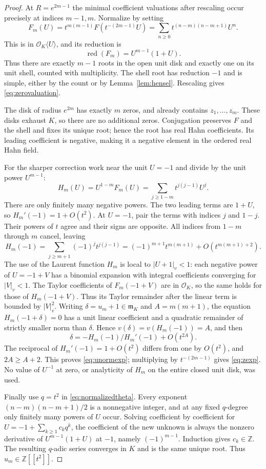\documentclass[11pt,a4paper]{article}
\numberwithin{equation}{section}
\theoremstyle{definition}
\theoremstyle{remark}
\newcommand{\Z}{\mathbb Z}
\newcommand{\OO}{\mathcal O}
\newcommand{\mm}{\mathfrak m}
\newcommand{\vabs}[1]{\lvert#1\rvert_v}
\newcommand{\red}{\operatorname{red}}
\begin{document}
\begin{proof}
At $R=e^{2m-1}$ the minimal coefficient valuations after rescaling occur
precisely at indices $m-1,m$. Normalize by setting
\begin{equation}\label{eq:normalizedtheta}
 F_m(U)=t^{m(m-1)}F\left(t^{-(2m-1)}U\right)
       =\sum_{n\ge0}t^{(n-m)(n-m+1)}U^n.
\end{equation}
This is in $\OO_K\langle U\rangle$, and its reduction is
\[
 \red(F_m)=U^{m-1}(1+U).
\]
Thus there are exactly $m-1$ roots in the open unit disk and exactly one on its
unit shell, counted with multiplicity. The shell root has reduction $-1$ and
is simple, either by the count or by Lemma~\ref{lem:hensel}.
Rescaling gives \eqref{eq:zerovaluation}.

The disk of radius $e^{2m}$ has exactly $m$ zeros, and already contains
$z_1,\ldots,z_m$. These disks exhaust $K$, so there are no additional zeros.
Conjugation preserves $F$ and the shell and fixes its unique root; hence the
root has real Hahn coefficients. Its leading coefficient is negative, making
it a negative element in the ordered real Hahn field.

For the sharper correction work near the unit $U=-1$ and divide by the unit
power $U^{m-1}$:
\begin{equation}\label{eq:Hm}
 H_m(U)=U^{1-m}F_m(U)
       =\sum_{j\ge1-m}t^{j(j-1)}U^j.
\end{equation}
There are only finitely many negative powers. The two leading terms are
$1+U$, so $H_m'(-1)=1+O(t^2)$. At $U=-1$, pair the terms with indices
$j$ and $1-j$. Their powers of $t$ agree and their signs are opposite.
All indices from $1-m$ through $m$ cancel, leaving
\[
 H_m(-1)=\sum_{j\ge m+1}(-1)^j t^{j(j-1)}
        =(-1)^{m+1}t^{m(m+1)}
          +O\!\left(t^{m(m+1)+2}\right).
\]
The use of the Laurent function $H_m$ is local to $\vabs{U+1}<1$:
each negative power of $U=-1+V$ has a binomial expansion with integral
coefficients converging for $\vabs V<1$. The Taylor coefficients of
$F_m(-1+V)$ are in $\OO_K$, so the same holds for those of $H_m(-1+V)$.
Thus its Taylor remainder after the linear term is bounded by $\vabs V^2$.
Writing $\delta=u_m+1\in\mm_K$ and $A=m(m+1)$, the equation
$H_m(-1+\delta)=0$ has a unit linear coefficient and a quadratic remainder
of strictly smaller norm than $\delta$. Hence
$v(\delta)=v(H_m(-1))=A$, and then
\[
 \delta=-H_m(-1)/H_m'(-1)+O(t^{2A}).
\]
The reciprocal of $H_m'(-1)=1+O(t^2)$ differs from one by $O(t^2)$,
and $2A\ge A+2$. This proves \eqref{eq:unormexp}; multiplying by
$t^{-(2m-1)}$ gives \eqref{eq:zexp}. No value of $U^{-1}$ at zero,
or analyticity of $H_m$ on the entire closed unit disk, was used.

Finally use $q=t^2$ in \eqref{eq:normalizedtheta}. Every exponent
$(n-m)(n-m+1)/2$ is a nonnegative integer, and at any fixed $q$-degree only
finitely many powers of $U$ occur. Solving coefficient by coefficient for
$U=-1+\sum_{k\ge1}c_kq^k$, the coefficient of the new unknown is always the
nonzero derivative of $U^{m-1}(1+U)$ at $-1$, namely $(-1)^{m-1}$.
Induction gives $c_k\in\Z$. The resulting $q$-adic series converges in $K$
and is the same unique root. Thus $u_m\in\Z[[t^2]]$.
\end{proof}
\end{document}
